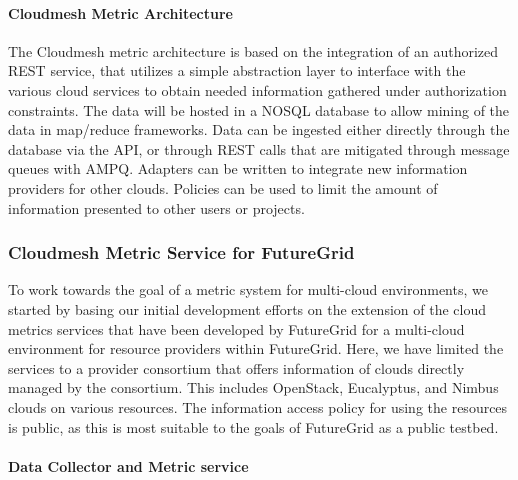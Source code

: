 \documentclass{tex/sig-alternate-2013}
\begin{document}
\paragraph{Cloudmesh Metric Architecture}

The Cloudmesh metric architecture is based on the integration of an authorized REST service, that utilizes a simple abstraction layer to interface with the various cloud services to obtain needed information gathered under authorization constraints. The data will be hosted in a NOSQL database to allow mining of the data in map/reduce frameworks. Data can be ingested either directly through the database via the API, or through REST calls that are mitigated through message queues with AMPQ. Adapters can be written to integrate new information providers for other clouds. Policies can be used to limit the amount of information presented to other users or projects.

\subsubsection{Cloudmesh Metric Service for FutureGrid}

To work towards the goal of a metric system for multi-cloud environments, we started by basing our initial development efforts on the extension of the cloud metrics services that have been developed by FutureGrid for a multi-cloud environment for resource providers within FutureGrid. Here, we have limited the services to a provider consortium that offers information of clouds directly managed by the consortium. This includes OpenStack, Eucalyptus, and Nimbus clouds on various resources. The information access policy for using the resources is public, as this is most suitable to the goals of FutureGrid as a public testbed.

\paragraph{Data Collector and Metric service}

\end{document}

